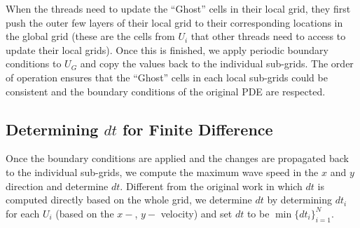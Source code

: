 \documentclass{article}
\begin{document}
When the threads need to update the ``Ghost'' cells in their local grid, they first push the outer few layers of their local grid to their corresponding locations in the global grid 
(these are the cells from $U_i$ that other threads need to access to update their local grids). Once this is finished, we apply periodic boundary conditions to $U_G$ and copy the values back 
to the individual sub-grids. The order of operation ensures that the ``Ghost'' cells in each local sub-grids could be consistent and the boundary conditions of the original PDE are respected. 

\subsection{Determining $dt$ for Finite Difference}
Once the boundary conditions are applied and the changes are propagated back to the individual sub-grids, 
we compute the maximum wave speed in the $x$ and $y$ direction and determine $dt$. 
Different from the original work in which $dt$ is computed directly based on the whole grid, 
we determine $dt$ by determining $dt_i$ for each $U_i$ (based on the $x-$, $y-$ velocity) and set 
$dt$ to be $\min\{dt_i\}_{i=1}^N$. 






  
\end{document}
